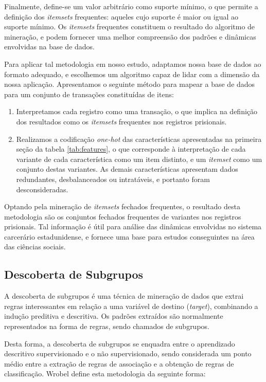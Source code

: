 \documentclass[12pt]{article}
\begin{document}
Finalmente, define-se um valor arbitrário como suporte mínimo, o que permite a definição dos \textit{itemsets} frequentes: aqueles cujo suporte é maior ou igual ao suporte mínimo. Os \textit{itemsets} frequentes constituem o resultado do algoritmo de mineração, e podem fornecer uma melhor compreensão dos padrões e dinâmicas envolvidas na base de dados.

Para aplicar tal metodologia em nosso estudo, adaptamos nossa base de dados ao formato adequado, e escolhemos um algoritmo capaz de lidar com a dimensão da nossa aplicação. Apresentamos o seguinte método para mapear a base de dados para um conjunto de transações constituídas de itens: 

\begin{enumerate}
    \item Interpretamos cada registro como uma transação, o que implica na definição dos resultados como os \textit{itemsets} frequentes nos registros prisionais.
    \item Realizamos a codificação \textit{one-hot} das características apresentadas na primeira seção da tabela \ref{tab:features}, o que corresponde à interpretação de cada variante de cada característica como um item distinto, e um \textit{itemset} como um conjunto destas variantes. As demais características apresentam dados redundantes, desbalanceados ou intratáveis, e portanto foram desconsideradas.
\end{enumerate}

Optando pela mineração de \textit{itemsets} fechados frequentes, o resultado desta metodologia são os conjuntos fechados frequentes de variantes nos registros prisionais. Tal informação é útil para análise das dinâmicas envolvidas no sistema carcerário estadunidense, e fornece uma base para estudos conseguintes na área das ciências sociais.

\subsection{Descoberta de Subgrupos}
A descoberta de subgrupos é uma técnica de mineração de dados que extrai regras interessantes em relação a uma variável de destino (\textit{target}), combinando a indução preditiva e descritiva. Os padrões extraídos são normalmente representados na forma de regras, sendo chamados de subgrupos.

Desta forma, a descoberta de subgrupos se enquadra entre o aprendizado descritivo supervisionado e o não supervisionado, sendo considerada um ponto médio entre a extração de regras de associação e a obtenção de regras de classificação. Wrobel define esta metodologia da seguinte forma:
\end{document}
